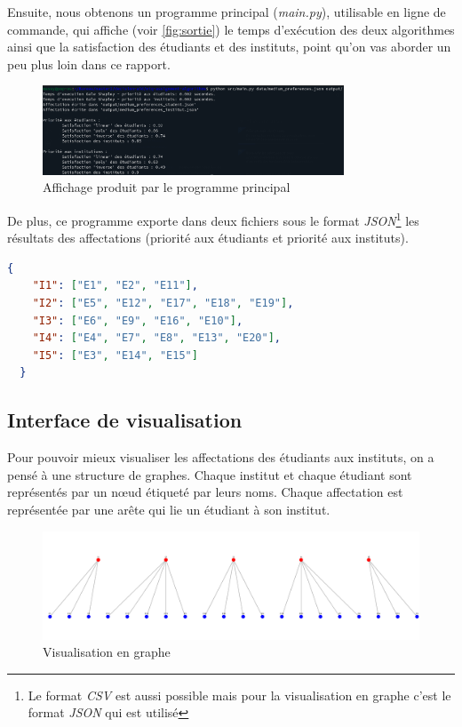 \documentclass[12pt,titlepage]{article}
\begin{document}
Ensuite, nous obtenons un programme principal (\textit{main.py}), utilisable en ligne de commande, qui affiche (voir \autoref{fig:sortie}) le temps d'exécution des deux algorithmes ainsi que la satisfaction des étudiants et des instituts, point qu'on vas aborder un peu plus loin dans ce rapport.

\begin{figure}[!h]
\centering
\includegraphics[width = 0.8\textwidth]{img/sortie_programme.png}
\caption{Affichage produit par le programme principal}
\label{fig:sortie}
\end{figure}

De plus, ce programme exporte dans deux fichiers sous le format \textit{JSON}\footnote{Le format \textit{CSV} est aussi possible mais pour la visualisation en graphe c'est le format \textit{JSON} qui est utilisé} les résultats des affectations (priorité aux étudiants et priorité aux instituts).

\begin{lstlisting}[language=json, caption="Fichier des affectations\, priorité au étudiants"]
  {
    "I1": ["E1", "E2", "E11"],
    "I2": ["E5", "E12", "E17", "E18", "E19"],
    "I3": ["E6", "E9", "E16", "E10"],
    "I4": ["E4", "E7", "E8", "E13", "E20"],
    "I5": ["E3", "E14", "E15"]
  }
\end{lstlisting}

\subsection{Interface de visualisation}

Pour pouvoir mieux visualiser les affectations des étudiants aux instituts, on a pensé à une structure de graphes. Chaque institut et chaque étudiant sont représentés par un nœud étiqueté par leurs noms. Chaque affectation est représentée par une arête qui lie un étudiant à son institut.

\begin{figure}[!h]
\centering
\includegraphics[width = 1.0\textwidth]{img/Screen_graph_dash.png}
\caption{Visualisation en graphe}
\end{figure}
\end{document}
